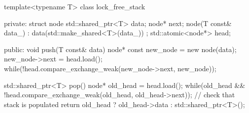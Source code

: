 \documentclass[11pt, a4paper]{article}
\theoremstyle{definition}
\theoremstyle{remark}
\begin{document}
\begin{cppcode}
template<typename T>
class lock_free_stack {
private:
    struct node {
        std::shared_ptr<T> data;
        node* next;
        node(T const& data_) : data(std::make_shared<T>(data_)) {}
    };
    std::atomic<node*> head;

public:
    void push(T const& data) {
        node* const new_node = new node(data);
        new_node->next = head.load();
        while(!head.compare_exchange_weak(new_node->next, new_node));
    }

    std::shared_ptr<T> pop() {
        node* old_head = head.load();
        while(old_head && !head.compare_exchange_weak(old_head, old_head->next)); // check that stack is populated
        return old_head ? old_head->data : std::shared_ptr<T>();
    }
}
\end{cppcode}
\end{document}
